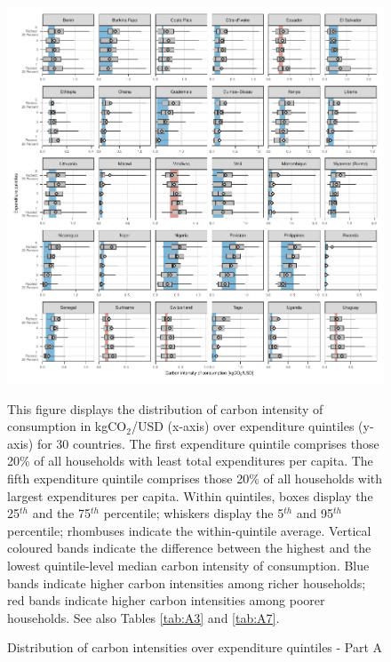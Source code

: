 \documentclass[12pt, a4paper]{article}
\newenvironment{subcaption}
{\strut
\vspace{-5pt}
\begin{minipage}[b]{0.9\textwidth}
  \hspace*{-\parindent}
  \footnotesize}
 {\end{minipage}}
\begin{document}
\begin{figure}[ht!]
  \centering
  \caption{Distribution of carbon intensities over expenditure quintiles - Part A} \label{fig:Quint_A}
  \includegraphics{1_Figures/Figures_Appendix/Figure_1_2017_Appendix_1}
  \begin{subcaption}
    This figure displays the distribution of carbon intensity of consumption in kgCO$_{2}$/USD (x-axis) over expenditure quintiles (y-axis) for 30 countries. The first expenditure quintile comprises those 20\% of all households with least total expenditures per capita. The fifth expenditure quintile comprises those 20\% of all households with largest expenditures per capita. Within quintiles, boxes display the 25$^{th}$ and the 75$^{th}$ percentile; whiskers display the 5$^{th}$ and 95$^{th}$ percentile; rhombuses indicate the within-quintile average. Vertical coloured bands indicate the difference between the highest and the lowest quintile-level median carbon intensity of consumption. Blue bands indicate higher carbon intensities among richer households; red bands indicate higher carbon intensities among poorer households. See also Tables \ref{tab:A3} and \ref{tab:A7}.
  \end{subcaption}

\end{figure}
\end{document}
